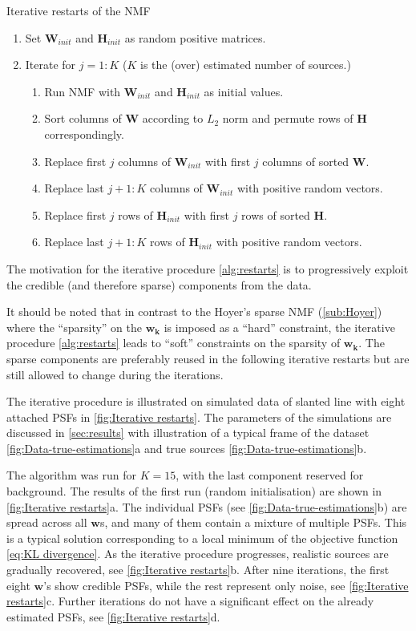 \begin{algorithm}
	\caption{Iterative restarts of the NMF}	
	\label{alg:restarts}
	\begin{enumerate}
		\item Set $\bm{W}_{init}$ and $\bm{H}_{init}$ as random positive matrices.
		\item Iterate for $j=1:K$ ($K$ is the (over) estimated number of sources.)
		\begin{enumerate}
			\item Run NMF with $\bm{W}_{init}$ and $\bm{H}_{init}$ as initial values.
			\item Sort columns of $\bm{W}$ according to $L_2$ norm and permute rows of $\bm{H}$ correspondingly.
			\item Replace first $j$ columns of $\bm{W}_{init}$ with first $j$ columns of sorted $\bm{W}$.
			\item Replace last $j+1:K$ columns of $\bm{W}_{init}$ with positive random vectors.
			\item Replace first $j$ rows of $\bm{H}_{init}$ with first $j$ rows of sorted $\bm{H}$.
			\item Replace last $j+1:K$ rows of $\bm{H}_{init}$ with positive random vectors.
		\end{enumerate}
	\end{enumerate}    
\end{algorithm}

The motivation for the iterative procedure \autoref{alg:restarts} is to progressively exploit the credible (and therefore sparse) components from the data.  

It should be noted that in contrast to the Hoyer's sparse NMF (\autoref{sub:Hoyer}) where the ``sparsity'' on the $\bm{w_{k}}$ is imposed as a ``hard'' constraint, the iterative procedure \autoref{alg:restarts} leads to ``soft'' constraints on the sparsity of $\bm{w_{k}}$. The sparse components are preferably reused in the following iterative restarts but are still allowed to change during the iterations. 

The iterative procedure is illustrated on simulated data of slanted line with eight attached PSFs in \autoref{fig:Iterative restarts}. The parameters of the simulations are discussed in  \autoref{sec:results} with illustration of a typical frame of the dataset \autoref{fig:Data-true-estimations}a and true sources \autoref{fig:Data-true-estimations}b.

The algorithm was run for $K=15$, with the last component reserved for background. The results of the first run (random initialisation) are shown in \autoref{fig:Iterative restarts}a. The individual PSFs (see \autoref{fig:Data-true-estimations}b) are spread across all $\bm{w}$s, and many of them contain a mixture of multiple PSFs. This is a typical solution corresponding to a local minimum of the objective function \autoref{eq:KL divergence}. As the iterative procedure progresses, realistic sources are gradually recovered, see \autoref{fig:Iterative restarts}b. After nine iterations, the first eight $\bm{w}$'s show credible PSFs, while the rest represent only noise, see \autoref{fig:Iterative restarts}c. Further iterations do not have a significant effect on the already estimated PSFs, see \autoref{fig:Iterative restarts}d. 

